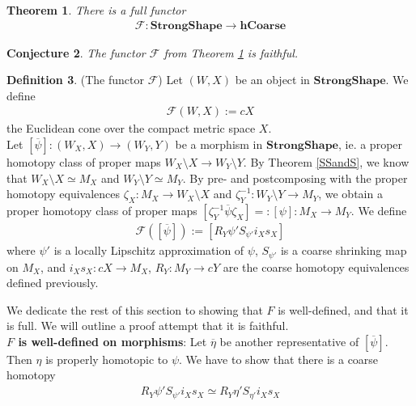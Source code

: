 \documentclass[a4paper,11pt]{article}
\theoremstyle{definition}
\newtheorem{definition}{Definition}[section]
\theoremstyle{plain}
\newtheorem{theorem}[definition]{Theorem}
\newtheorem{conjecture}[definition]{Conjecture}
\theoremstyle{remark}
\begin{document}
{\begin{theorem} \label{SSBornCoarse} There is a full functor 
\begin{align*}
\mathcal{F}: \mathbf{StrongShape} \rightarrow \mathbf{hCoarse}
\end{align*}
\end{theorem}

\begin{conjecture} The functor $\mathcal{F}$ from Theorem \ref{SSBornCoarse} is faithful. 
\end{conjecture}

\begin{definition} \label{DefF} (The functor $\mathcal{F}$)
Let $(W,X)$ be an object in $\mathbf{StrongShape}$. We define
\begin{align*}
\mathcal{F}(W,X) := cX 
\end{align*}
the Euclidean cone over the compact metric space $X$. \\

Let $[\overline{\psi}]: (W_{X},X) \rightarrow (W_{Y},Y)$ be a morphism in $\mathbf{StrongShape}$, ie.  a proper homotopy class of proper maps $W_{X}\setminus X\rightarrow W_{Y}\setminus Y$. By Theorem \ref{SSandS}, we know that $W_{X}\setminus X \simeq M_{X}$ and $W_{Y}\setminus Y \simeq M_{Y}$. By pre- and postcomposing with the proper homotopy equivalences $\zeta_{X}:M_{X}\rightarrow W_{X}\setminus X$ and $\zeta^{-1}_{Y}: W_{Y}\setminus Y\rightarrow M_{Y}$, we obtain a proper homotopy class of proper maps $[\zeta^{-1}_{Y}\overline{\psi}\zeta_{X}]=:[\psi]: M_{X}\rightarrow M_{Y}$. We define  
\begin{align*}
\mathcal{F}([\overline{\psi}]) := [R_{Y} \psi' S_{\psi'} i_{X} s_{X}]
\end{align*}
where $\psi'$ is a locally Lipschitz approximation of $\psi$, $S_{\psi'}$ is a coarse shrinking map on $M_{X}$, and $i_{X}s_{X}: cX\rightarrow M_{X}$, $R_{Y}: M_{Y}\rightarrow cY$ are the coarse homotopy equivalences defined previously. 
\end{definition}

We dedicate the rest of this section to showing that $F$ is well-defined, and that it is full. We will outline a proof attempt that it is faithful. \\


\textbf{$F$ is well-defined on morphisms}: Let $\overline{\eta}$ be another representative of $[\overline{\psi}]$. Then $\eta$ is properly homotopic to $\psi$. We have to show that there is a coarse homotopy  
\begin{align*}
R_{Y} \psi' S_{\psi'} i_{X}s_{X} \simeq R_{Y} \eta' S_{\eta' } i_{X} s_{X}
\end{align*}

}
\end{document}
